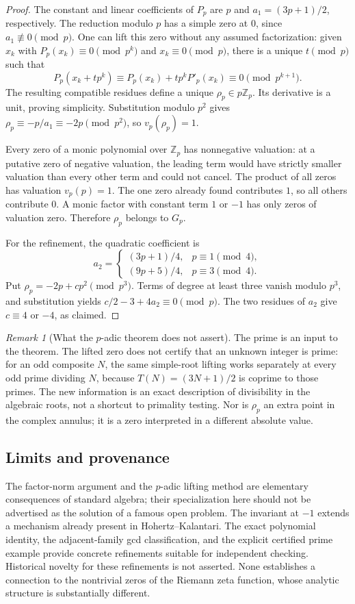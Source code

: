 \documentclass[11pt,a4paper]{article}
\theoremstyle{definition}
\theoremstyle{remark}
\newtheorem{remark}[theorem]{Remark}
\numberwithin{equation}{section}
\begin{document}
\begin{proof}
The constant and linear coefficients of $P_p$ are $p$ and
$a_1=(3p+1)/2$, respectively. The reduction modulo $p$ has a simple zero
at $0$, since $a_1\not\equiv0\pmod p$. One can lift this zero without
any assumed factorization: given $x_k$ with $P_p(x_k)\equiv0\pmod{p^k}$
and $x_k\equiv0\pmod p$, there is a unique $t\pmod p$ such that
\[
 P_p(x_k+tp^k)\equiv
 P_p(x_k)+tp^kP'_p(x_k)\equiv0\pmod{p^{k+1}}.
\]
The resulting compatible residues define a unique $\rho_p\in p\mathbb Z_p$.
Its derivative is a unit, proving simplicity. Substitution modulo $p^2$
gives $\rho_p\equiv-p/a_1\equiv-2p\pmod{p^2}$, so $v_p(\rho_p)=1$.

Every zero of a monic polynomial over $\mathbb Z_p$ has nonnegative
valuation: at a putative zero of negative valuation, the leading term
would have strictly smaller valuation than every other term and could
not cancel. The product of all zeros has valuation $v_p(p)=1$.
The one zero already found contributes $1$, so all others contribute $0$.
A monic factor with constant term $1$ or $-1$ has only zeros of valuation
zero. Therefore $\rho_p$ belongs to $G_p$.

For the refinement, the quadratic coefficient is
\[
 a_2=\begin{cases}(3p+1)/4,&p\equiv1\pmod4,\\
                  (9p+5)/4,&p\equiv3\pmod4.
       \end{cases}
\]
Put $\rho_p=-2p+cp^2\pmod{p^3}$. Terms of degree at least three vanish
modulo $p^3$, and substitution yields
$c/2-3+4a_2\equiv0\pmod p$. The two residues of $a_2$ give
$c\equiv4$ or $-4$, as claimed.
\end{proof}

\begin{remark}[What the $p$-adic theorem does not assert]
The prime is an input to the theorem. The lifted zero does not certify
that an unknown integer is prime: for an odd composite $N$, the same
simple-root lifting works separately at every odd prime dividing $N$,
because $T(N)=(3N+1)/2$ is coprime to those primes. The new information is
an exact description of divisibility in the algebraic roots, not a
shortcut to primality testing. Nor is $\rho_p$ an extra point in the
complex annulus; it is a zero interpreted in a different absolute value.
\end{remark}

\subsection{Limits and provenance}
The factor-norm argument and the $p$-adic lifting method are elementary
consequences of standard algebra; their specialization here should not be
advertised as the solution of a famous open problem. The invariant at
$-1$ extends a mechanism already present in Hohertz--Kalantari. The exact
polynomial identity, the adjacent-family gcd classification, and the
explicit certified prime example provide concrete refinements suitable
for independent checking. Historical novelty for these refinements is
not asserted. None establishes a connection to the nontrivial zeros of
the Riemann zeta function, whose analytic structure is substantially
different.
\end{document}
